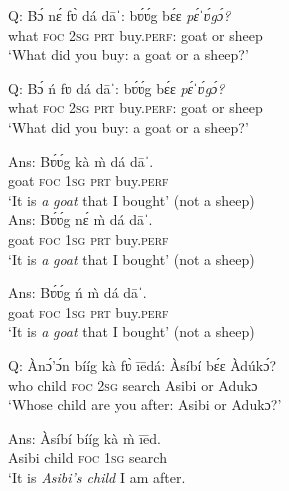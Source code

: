 \documentclass[output=paper
,newtxmath
,modfonts
,nonflat]{langsci/langscibook}
\begin{document}
\ex \label{ex:abubakari:6b} 
Q: \gll *Bɔ́  nɛ́  fʋ̀  dá  dāˈ:    bʋ́ʋ́g  bɛ́ɛ \textit{pɛ́ˈʋ́gɔ́?}\\
 what  \textsc{foc}  2\textsc{sg}  \textsc{prt}  buy.\textsc{perf}:  goat  or  sheep\\
  
\glt ‘What did you buy: a goat or a sheep?’ 

\ex \label{ex:abubakari:6c}
Q: \gll *Bɔ́  ń  fʋ  dá  dāˈ:    bʋ́ʋ́g  bɛ́ɛ \textit{pɛ́ˈʋ́gɔ́?}\\
what  \textsc{foc}  2\textsc{sg}  \textsc{prt}  buy.\textsc{perf}:  goat  or sheep \\
\glt ‘What did you buy: a goat or a sheep?’ 

\ex \label{ex:abubakari:6d}
Ans: \gll  Bʋ́ʋ́g  kà  m̀  dá  dāˈ.\\
goat  \textsc{foc}  1\textsc{sg}  \textsc{prt}  buy.\textsc{perf}\\
\glt ‘It is \textit{a} \textit{goat} that I bought’ (not a sheep)\\

\ex \label{ex:abubakari:6e}
Ans: \gll *Bʋ́ʋ́g  nɛ́  m̀  dá  dāˈ.\\
 goat  \textsc{foc}  1\textsc{sg}  \textsc{prt}  buy.\textsc{perf}\\
\glt ‘It is \textit{a} \textit{goat} that I bought’ (not a sheep)

\ex\label{ex:abubakari:6f}
Ans: \gll *Bʋ́ʋ́g  ń  m̀  dá  dāˈ. \\
goat  \textsc{foc}  1\textsc{sg}  \textsc{prt}  buy.\textsc{perf}\\
\glt ‘It is \textit{a} \textit{goat} that I bought’ (not a sheep)\\
\z
\z
 

\ea\label{ex:abubakari:7}
\ea\label{ex:abubakari:7a}
Q: \gll \`{A}nɔ́'ɔ́n  bííg  kà  fʋ̀  ī\={e}dá:  Àsíbí  bɛ́ɛ  Àdúkɔ́?      \\
who  child  \textsc{foc}  2\textsc{sg}  search  Asibi  or  Adukɔ         \\
\glt ‘Whose child are you after: Asibi or Adukɔ?’                         

\ex\label{ex:abubakari:7b}
Ans: \gll Àsíbí  bííg  kà  \`{m}  ī\={e}d.\\
Asibi  child  \textsc{foc}  1\textsc{sg}  search\\
\glt ‘It is \textit{Asibi’s child} I am after.
\z
\z 
\end{document}
